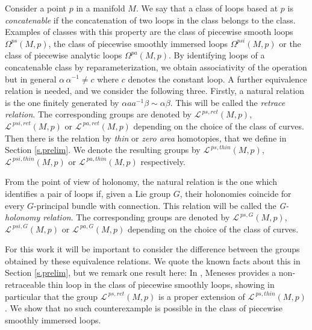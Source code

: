 \documentclass{amsart}
\begin{document}
Consider a point $p$ in a manifold $M$. We say that a class of loops based at $p$ is  \emph{concatenable} if the  concatenation of two loops in the class belongs to the class. Examples of classes with this property are the class of piecewise smooth loops $\Omega^{ps}(M,p)$,   the     
class of piecewise smoothly immersed loops $\Omega^{psi}(M,p)$ or the 
 class of piecewise analytic loops $\Omega^{pa}(M,p)$.      
By identifying loops of a concatenable class by reparameterization, we obtain associativity of the operation but in general $\alpha\,\alpha^{-1}\neq c$ where $c$ denotes the constant loop. A further equivalence relation is needed, and we consider the following three. Firstly, a natural relation is the one finitely generated by $\alpha aa^{-1}\beta\sim \alpha\beta$. This will be called the \emph{retrace relation}.  
The corresponding groups are denoted by  $\mathcal{L}^{\ ps,ret}(M,p)$, $\mathcal{L}^{\ psi ,ret}(M,p)$ or $\mathcal{L}^{\ pa,ret}(M,p)$ depending on the choice of the class of curves. 
Then there is the relation by {\em thin} or {\em zero area} homotopies, that we define in Section \ref{s.prelim}. We denote the resulting groups by $\mathcal{L}^{\ ps,thin}(M,p)$, $\mathcal{L}^{\ psi ,thin}(M,p)$ or $\mathcal{L}^{\ pa,thin}(M,p)$ respectively. 


From the point of view of holonomy,  the natural relation is the one which identifies a pair of loops if, given a Lie group $G$, their holonomies coincide for every $G$-principal bundle with connection. This relation will be called the \emph{G-holonomy relation}. %
The   corresponding groups are  denoted by  $\mathcal{L}^{\ ps,G}(M,p)$, $\mathcal{L}^{\ psi ,G}(M,p)$ or $\mathcal{L}^{\ pa, G}(M,p)$ depending on the choice of the class of curves. 





For this work it will be important to consider the difference between the groups obtained by these equivalence relations. We quote the known facts about this in Section \ref{s.prelim}, but we remark one result here: In \cite{Meneses}, Meneses  provides  a non-retraceable thin loop in the class of piecewise smoothly loops, showing in particular that the group $\mathcal{L}^{\ ps,ret}(M,p)$ is a proper extension of $\mathcal{L}^{\ ps,thin}(M,p)$. We show that no such counterexample is possible in the class of piecewise smoothly immersed loops.
\end{document}
